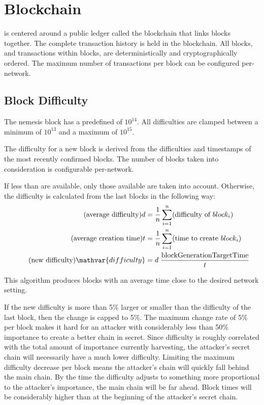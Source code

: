 \section{Blockchain}
\label{sec:blockchain}


\codenamespace is centered around a public ledger called the blockchain that links blocks together.
The complete transaction history is held in the blockchain.
All blocks, and transactions within blocks, are deterministically and cryptographically ordered.
The maximum number of transactions per block can be configured per-network.

\subsection{Block Difficulty}
\label{sec:blockchain:difficulty}

The nemesis block has a predefined  of $10^{14}$.
All difficulties are clamped between a minimum of $10^{13}$ and a maximum of $10^{15}$.

The difficulty for a new block is derived from the difficulties and timestamps of the most recently confirmed blocks.
The number of blocks taken into consideration is configurable per-network.

If less than  are available, only those available are taken into account.
Otherwise, the difficulty is calculated from the last  blocks in the following way:
\begin{align*}
	\tag{average difficulty} d &= \frac{1}{n}\sum_{i=1}^n (\text{difficulty of $block_i$}) \\
	\tag{average creation time} t &= \frac{1}{n}\sum_{i=1}^n (\text{time to create $block_i$}) \\
	\tag{new difficulty} \mathvar{difficulty} &= d \; \frac{\nemsetting{network}{blockGenerationTargetTime}}{t}
\end{align*}

This algorithm produces blocks with an average time close to the desired  network setting.

If the new difficulty is more than 5\% larger or smaller than the difficulty of the last block, then the change is capped to 5\%.
The maximum change rate of 5\% per block makes it hard for an attacker with considerably less than 50\% importance to create a better chain in secret.
Since difficulty is roughly correlated with the total amount of importance currently harvesting, the attacker's secret chain will necessarily have a much lower difficulty.
Limiting the maximum difficulty decrease per block means the attacker's chain will quickly fall behind the main chain.
By the time the difficulty adjusts to something more proportional to the attacker's importance, the main chain will be far ahead.
Block times will be considerably higher than  at the beginning of the attacker's secret chain.

